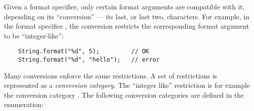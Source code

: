Given a format specifier, only certain format arguments are compatible with
it, depending on its ``conversion'' --- its last, or last two,
characters.  For example, in the format specifier , the
conversion  restricts the corresponding format argument
to be ``integer-like'':

\begin{Verbatim}
    String.format("%d", 5);         // OK
    String.format("%d", "hello");   // error
\end{Verbatim}

\noindent Many conversions enforce the same restrictions.  A set of
restrictions is represented as a \emph{conversion
category}. The ``integer like'' restriction is for example the conversion
category \@.  The following conversion categories are defined in the
 enumeration:


